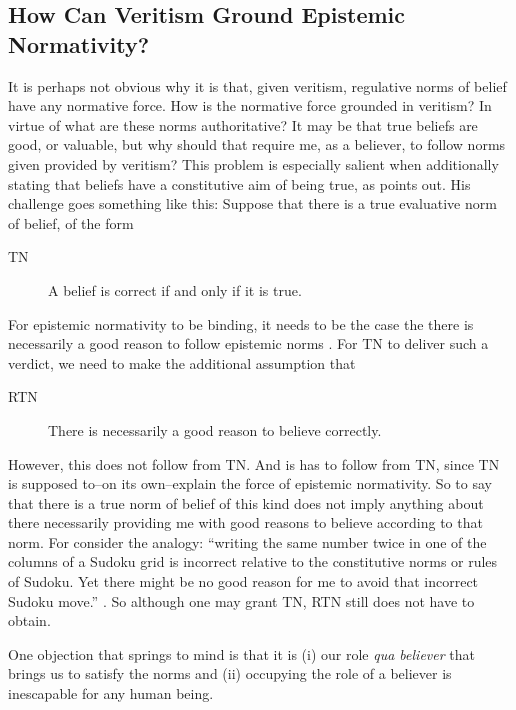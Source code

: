 \documentclass[12pt,numbers=noenddot]{scrartcl}
\begin{document}
\subsection{How Can Veritism Ground Epistemic Normativity?}\label{sec:groundingnormativity}
It is perhaps not obvious why it is that, given veritism, regulative norms of belief have any normative force. How is the normative force grounded in veritism? In virtue of what are these norms authoritative? It may be that true beliefs are good, or valuable, but why should that require me, as a believer, to follow norms given provided by veritism? This problem is especially salient when additionally stating that beliefs have a constitutive aim of being true, as \textcite{Cote-BouchardForthcoming-CTBCTA} points out. His challenge goes something like this: Suppose that there is a true evaluative norm of belief, of the form
\begin{description}
    \item[TN] A belief is correct if and only if it is true. \autocite{Wedgwood2002-WEDTAO}
\end{description}
For epistemic normativity to be binding, it needs to be the case the there is necessarily a good reason to follow epistemic norms \textcite[13]{Cote-BouchardForthcoming-CTBCTA}. For TN to deliver such a verdict, we need to make the additional assumption that
\begin{description}
    \item[RTN] There is necessarily a good reason to believe correctly.
\end{description}
However, this does not follow from TN. And is has to follow from TN, since TN is supposed to–on its own–explain the force of epistemic normativity. So to say that there is a true norm of belief of this kind does not imply anything about there necessarily providing me with good reasons to believe according to that norm. For consider the analogy: “writing the same number twice in one of the columns of a Sudoku grid is incorrect relative to the constitutive norms or rules of Sudoku. Yet there might be no good reason for me to avoid that incorrect Sudoku move.” \autocite[12]{Cote-BouchardForthcoming-CTBCTA}. So although one may grant TN, RTN still does not have to obtain.

One objection that springs to mind is that it is (i) our role \emph{qua believer} that brings us to satisfy the norms and (ii) occupying the role of a believer is inescapable for any human being.
\end{document}
